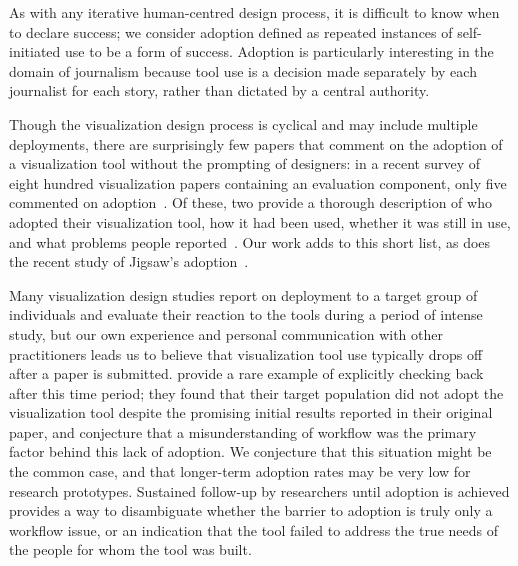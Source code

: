 As with any iterative human-centred design process, it is difficult to know when to declare success; we consider adoption defined as repeated instances of self-initiated use to be a form of success. 
Adoption is particularly interesting in the domain of journalism because tool use is a decision made separately by each journalist for each story, rather than dictated by a central authority.

Though the visualization design process is cyclical and may include multiple deployments, there are surprisingly few papers that comment on the adoption of a visualization tool without the prompting of designers: in a recent survey of eight hundred visualization papers containing an evaluation component, only five commented on adoption~\cite{Lam2012}. 
Of these, two provide a thorough description of who adopted their visualization tool, how it had been used, whether it was still in use, and what problems people reported~\cite{Kincaid2005,McKeon2009}.
Our work adds to this short list, as does the recent study of Jigsaw's adoption~\cite{Kang2012}.

Many visualization design studies report on deployment to a target group of individuals and evaluate their reaction to the tools during a period of intense study, but our own experience and personal communication with other practitioners leads us to believe that visualization tool use typically drops off after a paper is submitted. 
\citet{Gonzalez2003a} provide a rare example of explicitly checking back after this time period; they found that their target population did not adopt the visualization tool despite the promising initial results reported in their original paper, and conjecture that a misunderstanding of workflow was the primary factor behind this lack of adoption. 
We conjecture that this situation might be the common case, and that longer-term adoption rates may be very low for research prototypes. 
Sustained follow-up by researchers until adoption is achieved provides a way to disambiguate whether the barrier to adoption is truly only a workflow issue, or an indication that the tool failed to address the true needs of the people for whom the tool was built.

